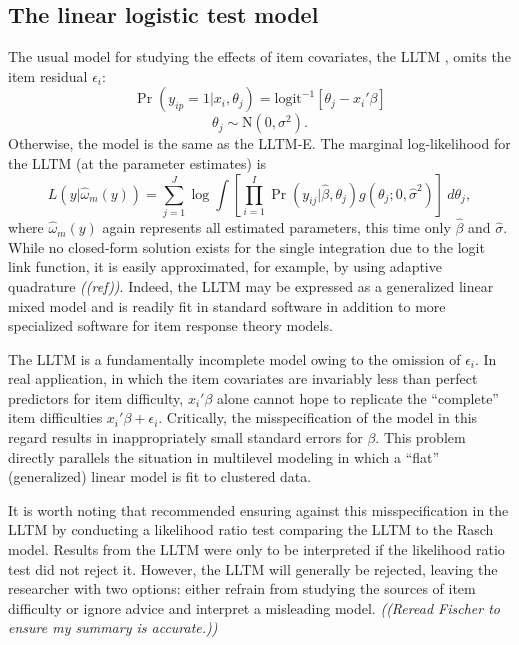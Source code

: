 \subsection{The linear logistic test model}

The usual model for studying the effects of item covariates, the LLTM \parencite[][]{Fischer1973}, omits the item residual $\epsilon_i$:
\begin{equation}
	\Pr(y_{ip} = 1 | x_i, \theta_j) =
	\mathrm{logit}^{-1} \left [ \theta_j - x_i'\beta \right ]
\end{equation}
\begin{equation}
	\theta_j \sim \mathrm{N}(0, \sigma^2)
.\end{equation}
Otherwise, the model is the same as the LLTM-E.
The marginal log-likelihood for the LLTM (at the parameter estimates) is
\begin{equation} \label{eq:lltm-likelihood}
	L(y | \hat \omega_m(y)) = 
	\sum_{j=1}^J \log
	\int \left [
		\prod_{i=1}^I
		\Pr(y_{ij} | \hat \beta, \theta_j)
		g(\theta_j ; 0, \hat \sigma^2)
	\right ] ~d \theta_j
,\end{equation}
where $\hat \omega_m(y)$ again represents all estimated parameters, this time only $\hat \beta$ and $\hat \sigma$.
While no closed-form solution exists for the single integration due to the logit link function, it is easily approximated, for example, by using adaptive quadrature \emph{((ref))}. Indeed, the LLTM may be expressed as a generalized linear mixed model and is readily fit in standard software in addition to more specialized software for item response theory models.

The LLTM is a fundamentally incomplete model owing to the omission of $\epsilon_i$. In real application, in which the item covariates are invariably less than perfect predictors for item difficulty, $x_i' \beta$ alone cannot hope to replicate the ``complete'' item difficulties $x_i' \beta + \epsilon_i$. Critically, the misspecification of the model in this regard results in inappropriately small standard errors for $\beta$. This problem directly parallels the situation in multilevel modeling in which a ``flat'' (generalized) linear model is fit to clustered data. 

It is worth noting that \textcite{Fischer1973} recommended ensuring against this misspecification in the LLTM by conducting a likelihood ratio test comparing the LLTM to the Rasch model. Results from the LLTM were only to be interpreted if the likelihood ratio test did not reject it. However, the LLTM will generally be rejected, leaving the researcher with two options: either refrain from studying the sources of item difficulty or ignore advice and interpret a misleading model. 
\emph{((Reread Fischer to ensure my summary is accurate.))}


